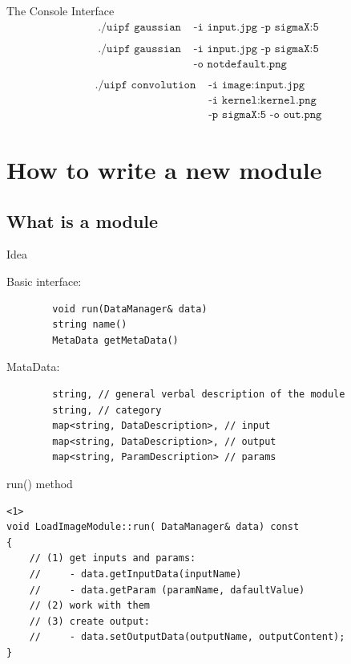 \documentclass{beamer}
\begin{document}
\begin{frame}{The Console Interface}
\Large
	\begin{align*}
		\texttt{./uipf gaussian} & \texttt{ -i input.jpg -p sigmaX:5} \\
	\end{align*}
	\vspace{-1.5cm}\pause
	\begin{align*}
		\texttt{./uipf gaussian} & \texttt{ -i input.jpg -p sigmaX:5} \\
								 & \texttt{ -o notdefault.png}\\
	\end{align*}
	\vspace{-1.5cm}\pause
	\begin{align*}
		\texttt{./uipf convolution} & \texttt{ -i image:input.jpg} \\
									& \texttt{ -i kernel:kernel.png} \\
									& \texttt{ -p sigmaX:5 -o out.png}
	\end{align*}

\end{frame}


\section{How to write a new module}

\subsection{What is a module}
\begin{frame}[fragile]{Idea}

	Basic interface:
	\begin{lstlisting}
		void run(DataManager& data)
		string name()
		MetaData getMetaData()
	\end{lstlisting}

 	MataData:
	\begin{lstlisting}
		string, // general verbal description of the module
		string, // category
		map<string, DataDescription>, // input
		map<string, DataDescription>, // output
		map<string, ParamDescription> // params
	\end{lstlisting}



\end{frame}


\begin{frame}[fragile]{run() method}

	\begin{lstlisting}<1>
void LoadImageModule::run( DataManager& data) const
{
	// (1) get inputs and params:
	//     - data.getInputData(inputName)
	//     - data.getParam (paramName, dafaultValue)
	// (2) work with them
	// (3) create output:
	//     - data.setOutputData(outputName, outputContent);
}
	\end{lstlisting}

\end{frame}
\end{document}
